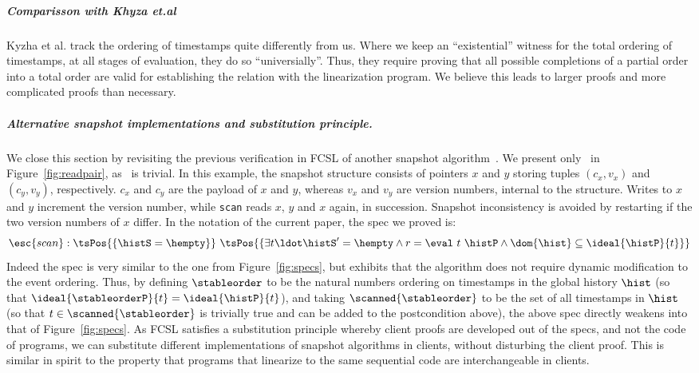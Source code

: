 \subparagraph*{Comparisson with Khyza et.al}
Kyzha et al.  track the ordering of timestamps
quite differently from us. Where we keep an ``existential'' witness
for the total ordering of timestamps, at all stages of evaluation,
they do so ``universially''. Thus, they require proving that all
possible completions of a partial order into a total order are valid
for establishing the relation with the linearization program. We
believe this leads to larger proofs and more complicated proofs than
necessary.



\subparagraph*{Alternative snapshot implementations and substitution principle.}

We close this section by revisiting the previous verification in FCSL
of another snapshot algorithm~\cite{SergeyNB+ESOP15}. We present only
\jyscan\ in Figure~\ref{fig:readpair}, as \jywrite\ is trivial. In
this example, the snapshot structure consists of pointers $x$ and $y$
storing tuples $(c_x, v_x)$ and $(c_y, v_y)$, respectively. $c_x$ and
$c_y$ are the payload of $x$ and $y$, whereas $v_x$ and $v_y$ are
version numbers, internal to the structure. Writes to $x$ and $y$
increment the version number, while {\tt scan} reads $x$, $y$ and $x$
again, in succession. Snapshot inconsistency is avoided by restarting
if the two version numbers of $x$ differ. In the notation of the
current paper, the spec we proved is:
\[
\esc{scan} : \tsPos{\{\histS = \hempty\}}\
\tsPos{\{\exists t\ldot \histS' = \hempty \wedge
  r = \eval\ t\ \histP \wedge \dom{\hist} \subseteq \ideal{\histP}{t}\}}
\]
Indeed the spec is very similar to the one from
Figure~\ref{fig:specs}, but exhibits that the algorithm does not
require dynamic modification to the event ordering. Thus, by defining
$\stableorder$ to be the natural numbers ordering on timestamps in the
global history $\hist$ (so that $\ideal{\stableorderP}{t} =
\ideal{\histP}{t}$), and taking $\scanned{\stableorder}$ to be the set
of all timestamps in $\hist$ (so that $t \in \scanned{\stableorder}$
is trivially true and can be added to the postcondition above), the
above spec directly weakens into that of Figure~\ref{fig:specs}. As
FCSL satisfies a substitution principle whereby client proofs are
developed out of the specs, and not the code of programs, we can
substitute different implementations of snapshot algorithms in
clients, without disturbing the client proof. This is similar in
spirit to the property that programs that linearize to the same
sequential code are interchangeable in clients.
